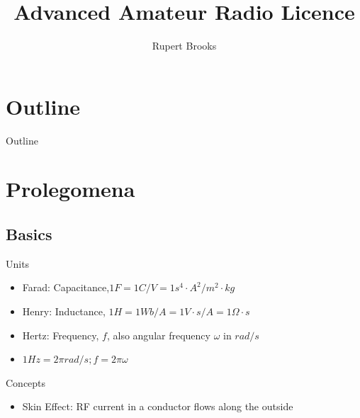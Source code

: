 \documentclass{beamer}
\title{Advanced Amateur Radio Licence}
\author{Rupert Brooks}
\begin{document}
\begin{frame}
\maketitle
\end{frame}



\section*{Outline}

\begin{frame}{Outline}{}
\tableofcontents
\end{frame}
\section{Prolegomena}

\subsection{Basics}
\begin{frame}{Units}{}
\begin{itemize}
\item Farad: Capacitance,$1F=1C/V=1s^4 \cdot A^2/m^2 \cdot kg$  
\item Henry: Inductance, $1H=1Wb/A=1V \cdot s/A=1\Omega\cdot s$
\item Hertz: Frequency, $f$, also angular frequency $\omega$ in $rad/s$
\item $1Hz=2\pi rad/s; f=2\pi\omega$
\end{itemize}
\end{frame}

\begin{frame}{Concepts}{}
\begin{itemize}
\item Skin Effect: RF current in a conductor flows along the outside
\end{itemize}
\end{frame}
\end{document}

